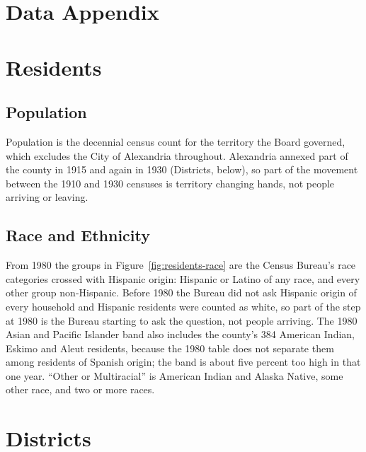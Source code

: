 \clearpage
\section*{Data Appendix}
\sectionbreaksfalse

\section*{Residents}

\subsection{Population}
Population is the decennial census count for the territory the Board governed, which
excludes the City of Alexandria throughout. Alexandria annexed part of the county in 1915
and again in 1930 (Districts, below), so part of the movement between the 1910 and 1930
censuses is territory changing hands, not people arriving or leaving.

\subsection{Race and Ethnicity}
From 1980 the groups in Figure~\ref{fig:residents-race} are the Census Bureau's race
categories crossed with Hispanic origin: Hispanic or Latino of any race, and every other
group non-Hispanic. Before 1980 the Bureau did not ask Hispanic origin of every household
and Hispanic residents were counted as white, so part of the step at 1980 is the Bureau starting to ask the question,
not people arriving. The 1980 Asian and Pacific Islander band also includes the
county's 384 American Indian, Eskimo and Aleut residents, because the 1980 table does not
separate them among residents of Spanish origin; the band is about five percent too high
in that one year.
``Other or Multiracial'' is American Indian and Alaska Native, some other race, and two or
more races.

\section*{Districts}\label{app:districts}


